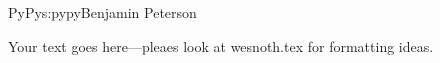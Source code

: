 \begin{aosachapter}{PyPy}{s:pypy}{Benjamin Peterson}

Your text goes here---pleaes look at wesnoth.tex for formatting ideas.

\end{aosachapter}
